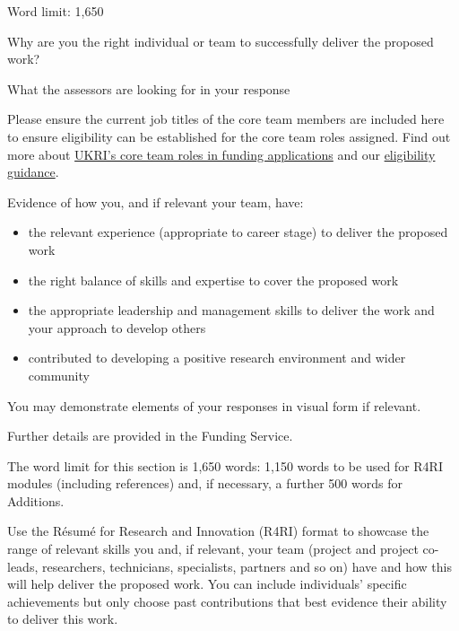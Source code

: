 
\begin{instruction}
Word limit: 1,650

Why are you the right individual or team to successfully deliver the proposed
work?

What the assessors are looking for in your response

Please ensure the current job titles of the core team members are included
here to ensure eligibility can be established for the core team roles assigned.
Find out more about
\href{https://www.ukri.org/publications/roles-in-funding-applications/roles-in-funding-applications-eligibility-responsibilities-and-costings-guidance/}{UKRI’s
core team roles in funding applications} and our
\href{https://www.ukri.org/councils/bbsrc/guidance-for-applicants/check-if-youre-eligible-for-funding/applicants-and-co-applicants/}{eligibility
guidance}.

Evidence of how you, and if relevant your team, have:

\begin{itemize}

    \item the relevant experience (appropriate to career stage) to deliver the proposed
work

    \item the right balance of skills and expertise to cover the proposed work

    \item the appropriate leadership and management skills to deliver the work and
your approach to develop others

    \item contributed to developing a positive research environment and wider
community

\end{itemize}

You may demonstrate elements of your responses in visual form if relevant.

Further details are provided in the Funding Service.

The word limit for this section is 1,650 words: 1,150 words to be used for R4RI
modules (including references) and, if necessary, a further 500 words for
Additions.

Use the Résumé for Research and Innovation (R4RI) format to showcase the range
of relevant skills you and, if relevant, your team (project and project
co-leads, researchers, technicians, specialists, partners and so on) have and
how this will help deliver the proposed work. You can include individuals’
specific achievements but only choose past contributions that best evidence
their ability to deliver this work.


\end{instruction}
